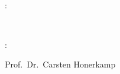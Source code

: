 \thispagestyle{empty}

\hfill

\vfill

\textit{\myTitle}\\
\textcopyright \quad {}


\bigskip

\noindent {}: \vspace{-0.5cm}
\begin{flushright}
	\myProf\\
	\myOtherProf
\end{flushright}


%
%


:\vspace{-0.5cm}
\begin{flushright}
	Prof.\ Dr.\ Carsten Honerkamp
\end{flushright}



